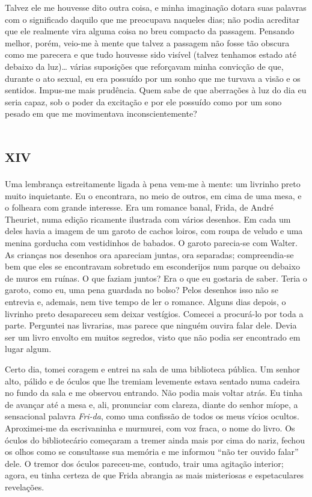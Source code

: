 Talvez ele me houvesse dito outra coisa, e minha imaginação dotara suas palavras com o significado daquilo que me preocupava naqueles dias; não podia acreditar que ele realmente vira alguma coisa no breu compacto da passagem. Pensando melhor, porém, veio-me à mente que talvez a passagem não fosse tão obscura como me parecera e que tudo houvesse sido visível (talvez tenhamos estado até debaixo da luz)\ldots{} várias suposições que reforçavam minha convicção de que, durante o ato sexual, eu era possuído por um sonho que me turvava a visão e os sentidos. Impus-me mais prudência. Quem sabe de que aberrações à luz do dia eu seria capaz, sob o poder da excitação e por ele possuído como por um sono pesado em que me movimentava inconscientemente?


\chapter*{\huge\centering\textsc{xiv}}

Uma lembrança estreitamente ligada à pena vem-me à mente: um livrinho preto muito inquietante. Eu o encontrara, no meio de outros, em cima de uma mesa, e o folheara com grande interesse. Era um romance banal, Frida, de André Theuriet, numa edição ricamente ilustrada com vários desenhos. Em cada um deles havia a imagem de um garoto de cachos loiros, com roupa de veludo e uma menina gorducha com vestidinhos de babados. O garoto parecia-se com Walter. As crianças nos desenhos ora apareciam juntas, ora separadas; compreendia-se bem que eles se encontravam sobretudo em esconderijos num parque ou debaixo de muros em ruínas. O que faziam juntos? Era o que eu gostaria de saber. Teria o garoto, como eu, uma pena guardada no bolso? Pelos desenhos isso não se entrevia e, ademais, nem tive tempo de ler o romance. Alguns dias depois, o livrinho preto desapareceu sem deixar vestígios. Comecei a procurá-lo por toda a parte. Perguntei nas livrarias, mas parece que ninguém ouvira falar dele. Devia ser um livro envolto em muitos segredos, visto que não podia ser encontrado em lugar algum.

Certo dia, tomei coragem e entrei na sala de uma biblioteca pública. Um senhor alto, pálido e de óculos que lhe tremiam levemente estava sentado numa cadeira no fundo da sala e me observou entrando. Não podia mais voltar atrás. Eu tinha de avançar até a mesa e, ali, pronunciar com clareza, diante do senhor míope, a sensacional palavra \textit{Fri-da}, como uma confissão de todos os meus vícios ocultos. Aproximei-me da escrivaninha e murmurei, com voz fraca, o nome do livro. Os óculos do bibliotecário começaram a tremer ainda mais por cima do nariz, fechou os olhos como se consultasse sua memória e me informou ``não ter ouvido falar'' dele. O tremor dos óculos pareceu-me, contudo, trair uma agitação interior; agora, eu tinha certeza de que Frida abrangia as mais misteriosas e espetaculares revelações.

